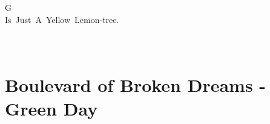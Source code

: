 \documentclass[]{book}
\let\stdsection\section
\renewcommand\section{\clearpage\stdsection}
\begin{document}
\hspace*{0.333em}\hspace*{0.333em}\hspace*{0.333em}\hspace*{0.333em}\hspace*{0.333em}\hspace*{0.333em}\hspace*{0.333em}\hspace*{0.333em}\hspace*{0.333em}\hspace*{0.333em}\hspace*{0.333em}\hspace*{0.333em}\hspace*{0.333em}\hspace*{0.333em}\hspace*{0.333em}\hspace*{0.333em}\hspace*{0.333em}G\\
Is~Just~A~Yellow~Lemon-tree.\\
~\\
~\\

\hypertarget{boulevard-of-broken-dreams---green-day}{%
\section{Boulevard of Broken Dreams - Green Day}\label{boulevard-of-broken-dreams---green-day}}
\end{document}
